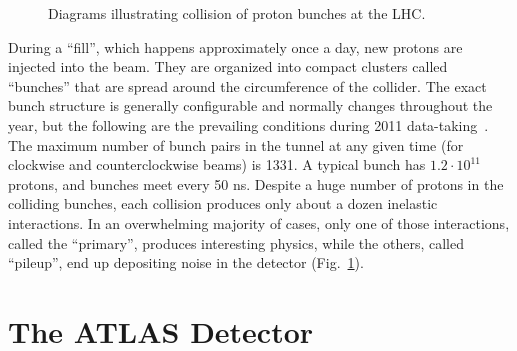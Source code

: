 \begin{figure}[phtb]
  \begin{center}
 \caption{ Diagrams illustrating collision of proton bunches at the LHC.}
 \label{fig:det:bunches}
 \end{center}
\end{figure}

During a ``fill'', which happens approximately once a day, new protons are injected into the beam. They are organized into compact clusters called ``bunches'' that are spread around the circumference of the collider. The exact bunch structure is generally configurable and normally changes throughout the year, but the following are the prevailing conditions during 2011 data-taking~\cite{ATLAS-DAPR-2011-01-002}. The maximum number of bunch pairs in the tunnel at any given time (for clockwise and counterclockwise beams) is 1331. A typical bunch has $1.2 \cdot 10^{11}$ protons, and bunches meet every 50 ns. Despite a huge number of protons in the colliding bunches, each collision produces only about a dozen inelastic interactions. In an overwhelming majority of cases, only one of those interactions, called the ``primary'', produces interesting physics, while the others, called ``pileup'', end up depositing noise in the detector (Fig.~\ref{fig:det:bunches}).

\section{ The ATLAS Detector }


